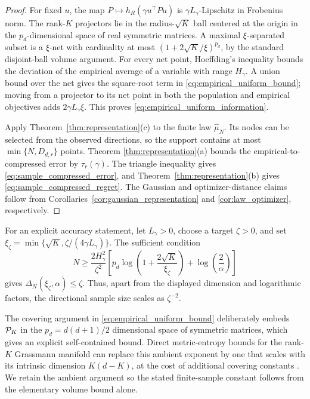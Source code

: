\begin{proof}
For fixed $u$, the map $P\mapsto h_R(\gamma u^{\top}Pu)$ is
$\gamma L_\gamma$-Lipschitz in Frobenius norm. The rank-$K$ projectors lie in
the radius-$\sqrt K$ ball centered at the origin in the $p_d$-dimensional space of real symmetric
matrices. A maximal $\xi$-separated subset is a $\xi$-net with cardinality at
most $(1+2\sqrt K/\xi)^{p_d}$, by the standard disjoint-ball volume argument.
For every net point, Hoeffding's inequality \cite{hoeffding1963} bounds the
deviation of the empirical average of a variable with range $H_\gamma$.
A union bound over the net gives the square-root term in
\eqref{eq:empirical_uniform_bound}; moving from a projector to its net point
in both the population and empirical objectives adds $2\gamma L_\gamma\xi$.
This proves \eqref{eq:empirical_uniform_information}.

Apply Theorem~\ref{thm:representation}(c) to the finite law
$\widehat\mu_N$. Its nodes can be selected from the observed directions, so
the support contains at most $\min\{N,D_{d,r}\}$ points. Theorem
\ref{thm:representation}(a) bounds the empirical-to-compressed error by
$\tau_r(\gamma)$. The triangle inequality gives
\eqref{eq:sample_compressed_error}, and Theorem~\ref{thm:representation}(b)
gives \eqref{eq:sample_compressed_regret}. The Gaussian and optimizer-distance
claims follow from Corollaries~\ref{cor:gaussian_representation} and
\ref{cor:law_optimizer}, respectively.
\end{proof}

For an explicit accuracy statement, let $L_\gamma>0$, choose a target
$\zeta>0$, and set
$\xi_\zeta=\min\{\sqrt K,\zeta/(4\gamma L_\gamma)\}$. The sufficient condition
\begin{equation}
N\ge \frac{2H_\gamma^2}{\zeta^2}
\left[p_d\log\!\left(1+\frac{2\sqrt K}{\xi_\zeta}\right)
+\log\!\left(\frac2\alpha\right)\right]
\label{eq:sample_complexity}
\end{equation}
gives $\Delta_N(\xi_\zeta,\alpha)\le\zeta$. Thus, apart from the displayed
dimension and logarithmic factors, the directional sample size scales as
$\zeta^{-2}$.

\begin{remark}
The covering argument in \eqref{eq:empirical_uniform_bound} deliberately
embeds $\mathcal P_K$ in the $p_d=d(d+1)/2$ dimensional space of symmetric matrices,
which gives an explicit self-contained bound. Direct metric-entropy bounds for
the rank-$K$ Grassmann manifold can replace this ambient exponent by one that
scales with its intrinsic dimension $K(d-K)$, at the cost of additional
covering constants \cite{dai2008}. We retain the ambient argument so the stated
finite-sample constant follows from the elementary volume bound alone.
\end{remark}

